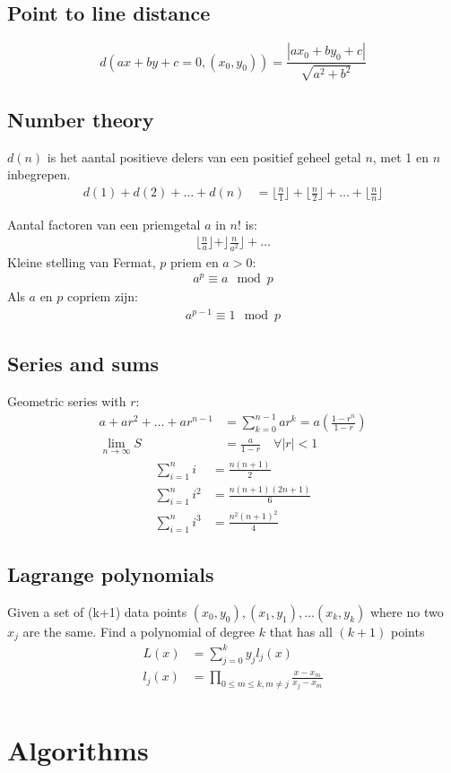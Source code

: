 \documentclass[a4paper, twocolumn]{article}
\begin{document}
\subsection*{Point to line distance}
\begin{equation*}
	d(ax+by+c=0, (x_0, y_0)) = \frac{|ax_0+by_0+c|}{\sqrt{a^2+b^2}}
\end{equation*}
\subsection*{Number theory}
$d(n)$ is het aantal positieve delers van een positief geheel getal $n$, met 1 en $n$ inbegrepen.
\begin{align*}
	d(1) + d(2) + \ldots + d(n) &= \lfloor \frac{n}{1} \rfloor + \lfloor \frac{n}{2} \rfloor + \ldots + \lfloor \frac{n}{n} \rfloor
\end{align*}

Aantal factoren van een priemgetal $a$ in $n!$ is:
\begin{align*}
	\lfloor \frac{n}{a} \rfloor + \rfloor \frac{n}{a^2} \rfloor + \ldots
\end{align*}
Kleine stelling van Fermat, $p$ priem en $a>0$:
\begin{align*}
	a^p \equiv a \mod p
\end{align*}
Als $a$ en $p$ copriem zijn:
\begin{align*}
	a^{p-1} \equiv 1 \mod p
\end{align*}
\subsection*{Series and sums}
Geometric series with $r$:
\begin{align*}
	a + ar^2 + \ldots + ar^{n-1} &= \sum^{n-1}_{k=0} ar^{k} = a\left(\frac{1-r^n}{1-r}\right) \\
	\lim_{n\rightarrow \infty} S &= \frac{a}{1-r} \quad \forall |r| < 1
\end{align*}
\begin{align*}
    \sum_{i=1}^n i &= \frac{n(n+1)}{2} \\
    \sum_{i=1}^n i^2 &= \frac{n(n+1)(2n+1)}{6} \\
    \sum_{i=1}^n i^3 &= \frac{n^2(n+1)^2}{4}
\end{align*}
\subsection{Lagrange polynomials}
Given a set of (k+1) data points $(x_0,y_0),(x_1,y_1), \ldots (x_k,y_k)$ where no two $x_j$ are the same. Find a polynomial of degree $k$ that has all $(k+1)$ points
\begin{align*}
L(x) &= \sum_{j=0}^k y_jl_j(x) \\
l_j(x) &= \prod_{0 \leq m \leq k, m \neq j} \frac{x-x_m}{x_j-x_m} \\
\end{align*}

\section{Algorithms}

\end{document}
